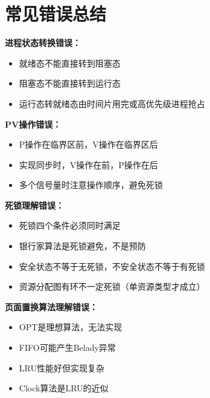 \documentclass[lang=cn,newtx,10pt,scheme=chinese]{../../elegantbook}
\begin{document}
\section{常见错误总结}

\textbf{进程状态转换错误：}
\begin{itemize}
  \item 就绪态不能直接转到阻塞态
  \item 阻塞态不能直接转到运行态
  \item 运行态转就绪态由时间片用完或高优先级进程抢占
\end{itemize}

\textbf{PV操作错误：}
\begin{itemize}
  \item P操作在临界区前，V操作在临界区后
  \item 实现同步时，V操作在前，P操作在后
  \item 多个信号量时注意操作顺序，避免死锁
\end{itemize}

\textbf{死锁理解错误：}
\begin{itemize}
  \item 死锁四个条件必须同时满足
  \item 银行家算法是死锁避免，不是预防
  \item 安全状态不等于无死锁，不安全状态不等于有死锁
  \item 资源分配图有环不一定死锁（单资源类型才成立）
\end{itemize}

\textbf{页面置换算法理解错误：}
\begin{itemize}
  \item OPT是理想算法，无法实现
  \item FIFO可能产生Belady异常
  \item LRU性能好但实现复杂
  \item Clock算法是LRU的近似
\end{itemize}

\end{document}
